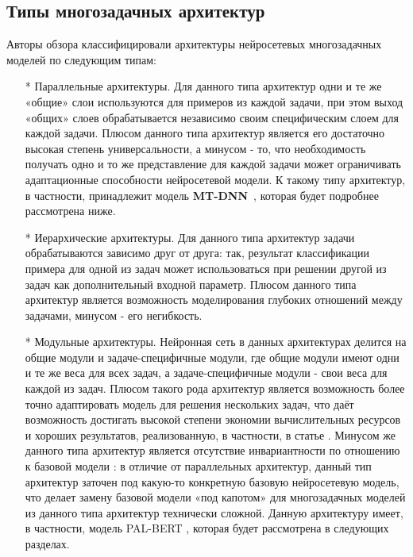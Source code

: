 \subsection{Типы многозадачных архитектур}
Авторы обзора \cite{chen_2021} классифицировали архитектуры нейросетевых многозадачных моделей по следующим типам:
\begin{itemize}
\item[*] Параллельные архитектуры. Для данного типа архитектур одни и те же «общие» слои используются для примеров из каждой задачи, при этом выход «общих» слоев обрабатывается независимо своим специфическим слоем для каждой задачи. Плюсом данного типа архитектур является его достаточно высокая степень универсальности, а минусом - то, что необходимость получать одно и то же представление для каждой задачи может ограничивать адаптационные способности нейросетевой модели. К такому типу архитектур, в частности, принадлежит модель \textbf{MT-DNN}~\cite{mtdnn}, которая будет подробнее рассмотрена ниже. 
\item[*] Иерархические архитектуры. Для данного типа архитектур задачи обрабатываются зависимо друг от друга: так, результат классификации примера для одной из задач может использоваться при решении другой из задач как дополнительный входной параметр. Плюсом данного типа архитектур является возможность моделирования глубоких отношений между задачами, минусом - его негибкость. 
\item[*] Модульные архитектуры. Нейронная сеть в данных архитектурах делится на общие модули и задаче-специфичные модули, где общие модули имеют одни и те же веса для всех задач, а задаче-специфичные модули - свои веса для каждой из задач. Плюсом такого рода архитектур является возможность более точно адаптировать модель для решения нескольких задач, что даёт возможность достигать высокой степени экономии вычислительных ресурсов и хороших результатов, реализованную, в частности, в статье \cite{maziarka_2021}. Минусом же данного типа архитектур является отсутствие инвариантности по отношению к базовой модели : в отличие от параллельных архитектур, данный тип архитектур заточен под какую-то конкретную базовую нейросетевую модель, что делает замену базовой модели «под капотом» для многозадачных моделей из данного типа архитектур технически сложной. Данную архитектуру имеет, в частности, модель PAL-BERT  \cite{stickland_2019}, которая будет рассмотрена в следующих разделах. 

\end{itemize}
